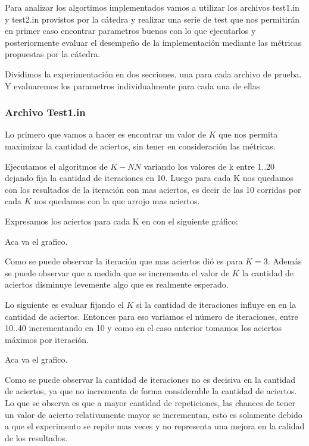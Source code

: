 Para analizar los algortimos implementados vamos a utilizar los archivos test1.in y test2.in provistos por la cátedra y realizar una serie de test que nos permitirán en primer caso encontrar parametros buenos con lo que ejecutarlos y posteriormente evaluar el desempeño de la implementación mediante las métricas propuestas por la cátedra.

Dividimos la experimentación en dos secciones, una para cada archivo de prueba. Y evaluaremos los parametros individualmente para cada una de ellas


\subsubsection {Archivo Test1.in}


Lo primero que vamos a hacer es encontrar un valor de $K$ que nos permita maximizar la cantidad de aciertos, sin tener en consideración las métricas.

Ejecutamos el algoritmos de $K-NN$ variando los valores de k entre {1..20} dejando fija la cantidad de iteraciones en 10. Luego para cada K nos quedamos con los resultados de la iteración con mas aciertos, es decir de las 10 corridas por cada $K$ nos quedamos con la que arrojo mas aciertos.

Expresamos los aciertos para cada K en con el siguiente gráfico:

Aca va el grafico.

Como se puede observar la iteración que mas aciertos dió es para $K = 3$. Además se puede observar que a medida que se incrementa el valor de $K$ la cantidad de aciertos disminuye levemente algo que es realmente esperado.

Lo siguiente es evaluar fijando el $K$ si la cantidad de iteraciones influye en en la cantidad de aciertos. Entonces para eso variamos el número de iteraciones, entre {10..40} incrementando en 10 y como en el caso anterior tomamos los aciertos máximos por iteración.

Aca va el grafico.

Como se puede observar la cantidad de iteraciones no es decisiva en la cantidad de aciertos, ya que no incrementa de forma considerable la cantidad de aciertos. Lo que se observa es que a mayor cantidad de repeticiones, las chances de tener un valor de acierto relativamente mayor se incrementan, esto es solamente debido a que el experimento se repite mas veces y no representa una mejora en la calidad de los resultados.

